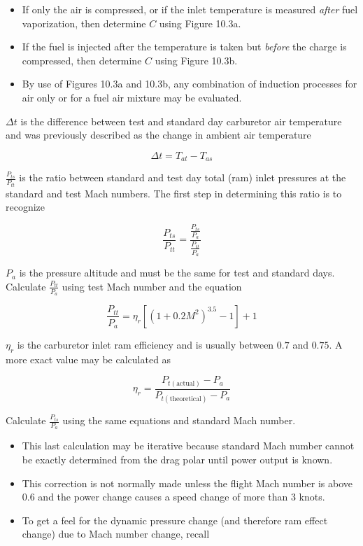 \documentclass[
]{book}
\providecommand{\tightlist}{%
  \setlength{\itemsep}{0pt}\setlength{\parskip}{0pt}}
\begin{document}
\begin{itemize}
\tightlist
\item
  If only the air is compressed, or if the inlet temperature is measured \emph{after} fuel vaporization, then determine \(C\) using Figure 10.3a.
\item
  If the fuel is injected after the temperature is taken but \emph{before} the charge is compressed, then determine \(C\) using Figure 10.3b.
\item
  By use of Figures 10.3a and 10.3b, any combination of induction processes for air only or for a fuel air mixture may be evaluated.
\end{itemize}

\(\Delta t\) is the difference between test and standard day carburetor air temperature and was previously described as the change in ambient air temperature

\[
\Delta t = T_{at} - T_{as} 
\]

\(\frac{P_{ts}}{P_{tt}}\) is the ratio between standard and test day total (ram) inlet pressures at the standard and test Mach numbers. The first step in determining this ratio is to recognize

\[
\frac{P_{ts}}{P_{tt}} = \frac{ \frac{P_{ts}}{P_{a}} }{ \frac{P_{tt}}{P_{a}} }
\]

\(P_a\) is the pressure altitude and must be the same for test and standard days. Calculate \(\frac{P_{tt}}{P_{a}}\) using test Mach number and the equation

\[
\frac{P_{tt}}{P_{a}} = \eta_r \left[ \left( 1 + 0.2 M^2 \right)^{3.5} -1 \right] +1
\]

\(\eta_r\) is the carburetor inlet ram efficiency and is usually between \(0.7\) and \(0.75\). A more exact value may be calculated as

\[
\eta_r = \frac{ P_{t \left( \text{actual} \right)} - P_a }{ P_{t \left( \text{theoretical} \right)} - P_a }
\]

Calculate \(\frac{P_{ts}}{P_{a}}\) using the same equations and standard Mach number.

\begin{itemize}
\tightlist
\item
  This last calculation may be iterative because standard Mach number cannot be exactly determined from the drag polar until power output is known.
\item
  This correction is not normally made unless the flight Mach number is above \(0.6\) and the power change causes a speed change of more than \(3\) knots.
\item
  To get a feel for the dynamic pressure change (and therefore ram effect change) due to Mach number change, recall
\end{itemize}
\end{document}
